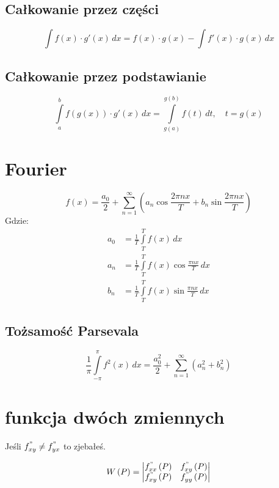 \documentclass[a4paper,12pt]{article}
\begin{document}
\begin{multicols}{2}
    \subsection*{Całkowanie przez części}
    \[
        \int f\left( x \right) \cdot g' \left( x \right)\, dx = f\left( x \right)\cdot g\left( x \right) - \int f' \left( x \right) \cdot g\left( x \right)\, dx
    \]

    \subsection*{Całkowanie przez podstawianie}
    \[
        \int \limits^b_a f\left(g \left(x\right)\right) \cdot g' \left(x\right)\, dx = \int \limits^{g\left(b\right)}_{g\left(a\right)} f \left(t\right)\, dt,\quad t = g \left(x\right)
    \]
    \section{Fourier}
    \[
        f\left(x\right) = \frac{a_0}{2} + \sum \limits^\infty_{n = 1} \left( a_n \cos \frac{2\pi nx}{T} + b_n \sin \frac{2\pi nx}{T} \right)
    \]
    Gdzie:
    \begin{align*}
        a_0 &= \frac{1}{T} \int \limits^T_T f \left( x \right)\, dx \\
        a_n &= \frac{1}{T} \int \limits^T_T f \left( x \right) \cos \frac{\pi n x}{T}\, dx \\
        b_n &= \frac{1}{T} \int \limits^T_T f \left( x \right) \sin \frac{\pi n x}{T}\, dx
    \end{align*}

    \subsection*{Tożsamość Parsevala}
    \[
        \frac{1}{\pi}\int \limits^\pi_{ -\pi} f^2 \left(x\right)\, dx = \frac{a_0^2}{2} + \sum \limits^\infty_{n = 1} \left( a^2_n + b^2_n \right)
    \]

    \section{funkcja dwóch zmiennych}
    Jeśli $f^"_{xy} \not = f^"_{yx}$ to zjebałeś.

    \[
        W\left(P\right) = \left|
        \begin{matrix}
            f^"_{x x}\left(P\right) & f^"_{x y}\left(P\right) \\
            f^"_{x y}\left(P\right) & f^"_{y y}\left(P\right)
        \end{matrix}\right|
    \]


\end{multicols}
\end{document}
